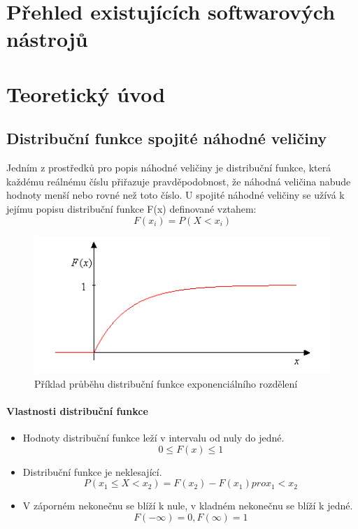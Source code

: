 \documentclass[FM,RP]{tulthesis}
\begin{document}
\chapter{Přehled existujících softwarových nástrojů}

\chapter{Teoretický úvod}
        
    \section{Distribuční funkce spojité náhodné veličiny}
        Jedním z prostředků pro popis náhodné veličiny je distribuční funkce, která každému
        reálnému číslu přiřazuje pravděpodobnost, že náhodná veličina nabude hodnoty menší nebo
        rovné než toto číslo.\cite{6}
        U spojité náhodné veličiny se užívá k jejímu popisu distribuční funkce F(x) definované vztahem: 
        $$ F(x_{i}) = P(X<x_{i}) $$
            \begin{figure}[h]
                \centering
                \includegraphics[scale=0.75]{pic/distrib.png}
                \caption{Příklad průběhu distribuční funkce exponenciálního rozdělení} \label{Obrázek č. 2.1}
            \end{figure}
        \subsubsection{Vlastnosti distribuční funkce}
            \begin{itemize} 
                \item
                Hodnoty distribuční funkce leží v intervalu od nuly do jedné.
                $$ 0 \leq F(x) \leq 1 $$
                \item
                Distribuční funkce je neklesající.
                $$  P(x_{1} \leq X < x_{2}) = F(x_{2}) - F(x_{1})   pro x_{1} < x_{2} $$
                \item
                V záporném nekonečnu se blíží k nule, v kladném nekonečnu se blíží k jedné.
                $$ F(- ∞) = 0, F(∞) = 1 $$ 
            \end{itemize}
\end{document}
